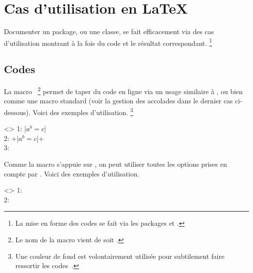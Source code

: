 \documentclass{../main/main}
\begin{document}
\section{Cas d'utilisation en \LaTeX}
\label{tutodoc-listing-latex}

Documenter un package, ou une classe, se fait efficacement via des cas d'utilisation montrant à la fois du code et le résultat correspondant.%
\footnote{
    La mise en forme des codes se fait via les packages  et  .
}



\subsection{Codes }
\label{tutodoc-listing-latex-inline}

\begin{tdocexa}
    La macro \,%
    \footnote{
        Le nom de la macro  vient de  soit .
    }
    permet de taper du code en ligne via un usage similaire à , ou bien comme une macro standard (voir la gestion des accolades dans le dernier cas ci-dessous).
    Voici des exemples d'utilisation.%
    \footnote{
    	Une couleur de fond est volontairement utilisée pour subtilement faire ressortir les codes \tdoclatexin{\LaTeX}\,.
    }

    \begin{tdoclatex}<>
1: \tdoclatexin|$a^b = c$|               \\
2: \tdoclatexin+\tdoclatexin|$a^b = c$|+ \\
3: 
	\end{tdoclatex}
\end{tdocexa}


\begin{tdocexa}
    Comme la macro  s'appuie sur , on peut utiliser toutes les options prises en compte par .
    Voici des exemples d'utilisation.

    \begin{tdoclatex}<>
1:  \\
2: 
	\end{tdoclatex}
\end{tdocexa}
\end{document}

